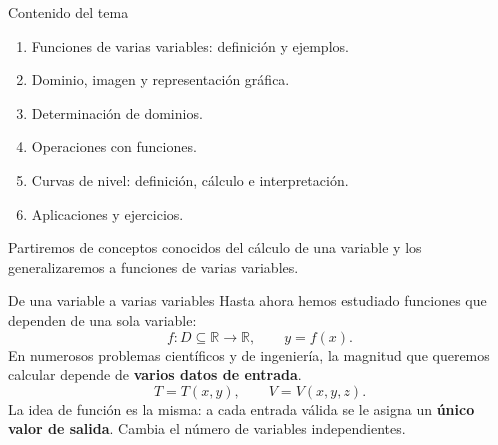 \documentclass[main.tex]{subfiles}
\begin{document}
\graphicspath{{imagenes/tema1/}{../imagenes/tema1/}}

\begin{frame}{Contenido del tema}
\begin{enumerate}
\item Funciones de varias variables: definición y ejemplos.
\item Dominio, imagen y representación gráfica.
\item Determinación de dominios.
\item Operaciones con funciones.
\item Curvas de nivel: definición, cálculo e interpretación.
\item Aplicaciones y ejercicios.
\end{enumerate}
\medskip
\small
Partiremos de conceptos conocidos del cálculo de una variable y
los generalizaremos a funciones de varias variables.
\end{frame}

\begin{frame}{De una variable a varias variables}
Hasta ahora hemos estudiado funciones que dependen de una sola variable:
\[
f:D\subseteq\mathbb R\longrightarrow\mathbb R,\qquad y=f(x).
\]
\medskip
En numerosos problemas científicos y de ingeniería, la magnitud que
queremos calcular depende de \textbf{varios datos de entrada}.
\medskip
\[
T=T(x,y),\qquad V=V(x,y,z).
\]
\medskip
La idea de función es la misma: a cada entrada válida se le asigna
un \textbf{único valor de salida}. Cambia el número de variables
independientes.
\end{frame}
\end{document}
